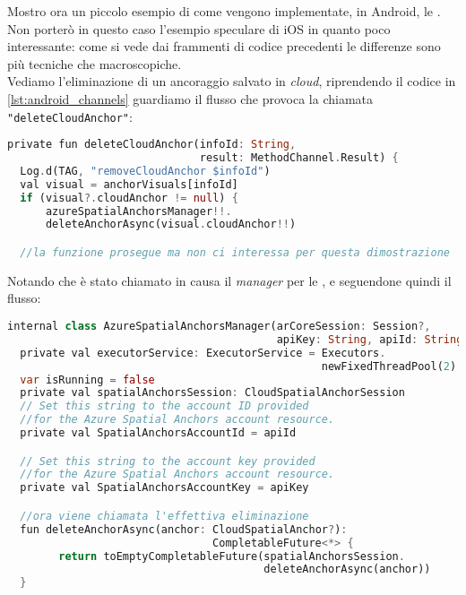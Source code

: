 Mostro ora un piccolo esempio di come vengono implementate, in Android, le \asa{}. Non porterò in questo caso l'esempio speculare di iOS in quanto poco interessante: come si vede dai frammenti di codice precedenti le differenze sono più tecniche che macroscopiche.\\
Vediamo l'eliminazione di un ancoraggio salvato in \textit{cloud}, riprendendo il codice in \ref{lst:android_channels} guardiamo il flusso che provoca la chiamata \verb+"deleteCloudAnchor"+:

\begin{lstlisting}[language=dart, label={lst:asa_android_call}, firstnumber=1,caption={Eliminazione \textit{cloud anchor} lato Android, chiamata}]
private fun deleteCloudAnchor(infoId: String,
                              result: MethodChannel.Result) {
  Log.d(TAG, "removeCloudAnchor $infoId")
  val visual = anchorVisuals[infoId]
  if (visual?.cloudAnchor != null) {
      azureSpatialAnchorsManager!!.
      deleteAnchorAsync(visual.cloudAnchor!!)

  //la funzione prosegue ma non ci interessa per questa dimostrazione
\end{lstlisting}

Notando che è stato chiamato in causa il \textit{manager} per le \asa{}, e seguendone quindi il flusso:

\begin{lstlisting}[language=dart, label={lst:asa_manager_delete}, firstnumber=1,caption={Eliminazione \textit{cloud anchor} lato Android, chiamata}]
internal class AzureSpatialAnchorsManager(arCoreSession: Session?, 
                                          apiKey: String, apiId: String) {
  private val executorService: ExecutorService = Executors.
                                                 newFixedThreadPool(2)
  var isRunning = false
  private val spatialAnchorsSession: CloudSpatialAnchorSession
  // Set this string to the account ID provided 
  //for the Azure Spatial Anchors account resource.
  private val SpatialAnchorsAccountId = apiId

  // Set this string to the account key provided 
  //for the Azure Spatial Anchors account resource.
  private val SpatialAnchorsAccountKey = apiKey

  //ora viene chiamata l'effettiva eliminazione
  fun deleteAnchorAsync(anchor: CloudSpatialAnchor?): 
                                CompletableFuture<*> {
        return toEmptyCompletableFuture(spatialAnchorsSession.
                                        deleteAnchorAsync(anchor))
  }
\end{lstlisting}

